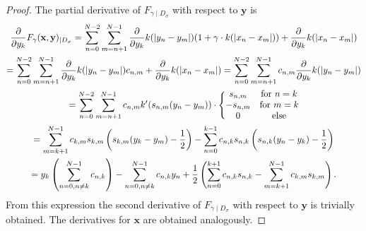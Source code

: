 \begin{proof} The partial derivative of $F_{\gamma \mid D_{\sigma}}$ with respect to $\textbf{y}$ is
\begin{multline*}
    \frac{\partial}{\partial y_k}F_{\gamma}(\textbf{x},\textbf{y})_{\mid D_{\sigma}} = \sum_{n=0}^{N-2} \sum_{m=n+1}^{N-1} \frac{\partial}{\partial y_k} k(\lvert y_n-y_m\rvert)(1+\gamma \cdot k(\lvert x_n-x_m\rvert)) + \frac{\partial}{\partial y_k} k(\lvert x_n-x_m\rvert) \\
    = \sum_{n=0}^{N-2} \sum_{m=n+1}^{N-1} \frac{\partial}{\partial y_k} k(\lvert y_n-y_m\rvert)c_{n,m} + \frac{\partial}{\partial y_k} k(\lvert x_n-x_m\rvert) = \sum_{n=0}^{N-2} \sum_{m=n+1}^{N-1} c_{n,m} \frac{\partial}{\partial y_k} k(\lvert y_n-y_m\rvert) \\
    = \sum_{n=0}^{N-2} \sum_{m=n+1}^{N-1} c_{n,m} k'(s_{n,m}(y_n-y_m)) \cdot \Bigg\{ 
    \begin{matrix}  
        s_{n,m} & \text{for } n=k \\
        -s_{n,m} & \text{for } m=k \\
        0 & \text{else}
    \end{matrix} \\
    = \sum_{m=k+1}^{N-1} c_{k,m} s_{k,m}\left( s_{k,m}(y_k-y_m) - \frac{1}{2} \right) - \sum_{n=0}^{k-1} c_{n,k} s_{n,k} \left( s_{n,k}(y_n-y_k) - \frac{1}{2} \right) \\
    = y_k \left( \sum_{n=0, n\neq k}^{N-1} c_{n,k} \right) - \sum_{n=0, n\neq k}^{N-1} c_{n,k} y_n + \frac{1}{2} \left( \sum_{n=0}^{k+1} c_{n,k} s_{n,k} - \sum_{m=k+1}^{N-1} c_{k,m} s_{k,m} \right).
\end{multline*}
From this expression the second derivative of $F_{\gamma \mid D_{\sigma}}$ with respect to $\textbf{y}$ is trivially obtained. The derivatives for $\textbf{x}$ are obtained analogously.
\end{proof}
\vspace{2mm}

